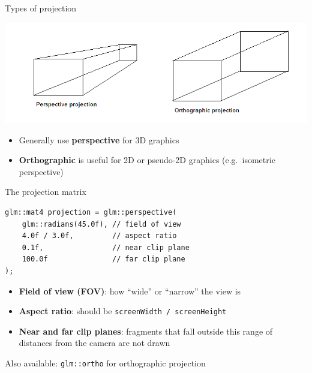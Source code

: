 \begin{frame}{Types of projection}
	\pause\begin{center}
		\includegraphics[width=\textwidth]{orthographic_perspective}
	\end{center}
	\begin{itemize}
		\pause\item Generally use \textbf{perspective} for 3D graphics
		\pause\item \textbf{Orthographic} is useful for 2D or pseudo-2D graphics (e.g.\ isometric perspective)
	\end{itemize}
\end{frame}

\begin{frame}[fragile]{The projection matrix}
	\pause\begin{lstlisting}
glm::mat4 projection = glm::perspective(
	glm::radians(45.0f), // field of view
	4.0f / 3.0f,         // aspect ratio
	0.1f,                // near clip plane
	100.0f               // far clip plane
);
	\end{lstlisting}
	\begin{itemize}
		\pause\item \textbf{Field of view (FOV)}: how ``wide'' or ``narrow'' the view is
		\pause\item \textbf{Aspect ratio}: should be \lstinline{screenWidth / screenHeight}
		\pause\item \textbf{Near and far clip planes}: fragments that fall outside this range of distances from the camera are not drawn
	\end{itemize}
	\pause Also available: \lstinline{glm::ortho} for orthographic projection
\end{frame}

